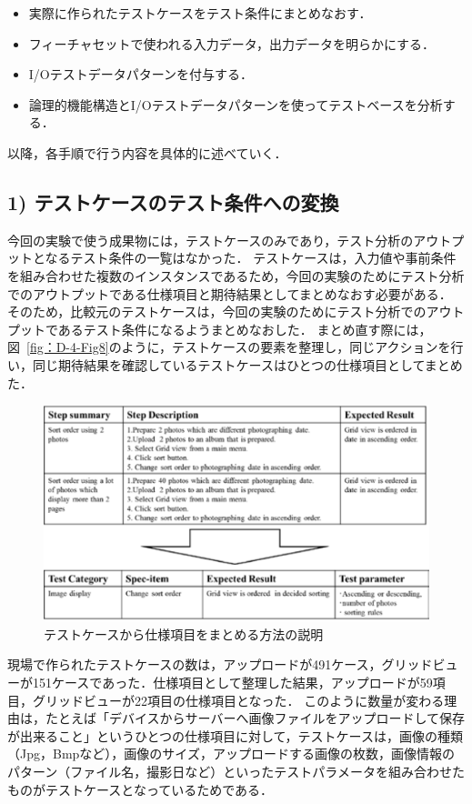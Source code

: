 \begin{itemize}
\item 実際に作られたテストケースをテスト条件にまとめなおす．
\item フィーチャセットで使われる入力データ，出力データを明らかにする．
\item I/Oテストデータパターンを付与する．
\item 論理的機能構造とI/Oテストデータパターンを使ってテストベースを分析する．
\end{itemize}

以降，各手順で行う内容を具体的に述べていく．

\subsection{1) テストケースのテスト条件への変換}

今回の実験で使う成果物には，テストケースのみであり，テスト分析のアウトプットとなるテスト条件の一覧はなかった．
テストケースは，入力値や事前条件を組み合わせた複数のインスタンスであるため，今回の実験のためにテスト分析でのアウトプットである仕様項目と期待結果としてまとめなおす必要がある．
そのため，比較元のテストケースは，今回の実験のためにテスト分析でのアウトプットであるテスト条件になるようまとめなおした．
まとめ直す際には，図~\ref{fig：D-4-Fig8}のように，テストケースの要素を整理し，同じアクションを行い，同じ期待結果を確認しているテストケースはひとつの仕様項目としてまとめた．

\begin{figure}[htbp]
\begin{center}
\includegraphics[width=12cm]{./image/D-4-Fig8.png}
\caption{テストケースから仕様項目をまとめる方法の説明}
\label{fig:D-4-Fig8}
\end{center}
\end{figure}

現場で作られたテストケースの数は，アップロードが491ケース，グリッドビューが151ケースであった．仕様項目として整理した結果，アップロードが59項目，グリッドビューが22項目の仕様項目となった．
このように数量が変わる理由は，たとえば「デバイスからサーバーへ画像ファイルをアップロードして保存が出来ること」というひとつの仕様項目に対して，テストケースは，画像の種類（Jpg，Bmpなど），画像のサイズ，アップロードする画像の枚数，画像情報のパターン（ファイル名，撮影日など）といったテストパラメータを組み合わせたものがテストケースとなっているためである．

